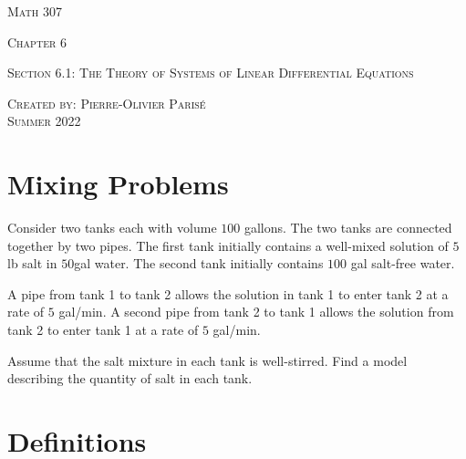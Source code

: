 \documentclass[12pt,a4paper]{article}
\newcounter{example}[section]
\begin{document}
\thispagestyle{empty}

\begin{center}
\vspace*{2.5cm}

{\Huge \textsc{Math 307}}

\vspace*{2cm}

{\LARGE \textsc{Chapter 6}} 

\vspace*{0.75cm}

\noindent\textsc{Section 6.1: The Theory of Systems of Linear Differential Equations}

\vspace*{0.75cm}

\tableofcontents

\vfill

\noindent \textsc{Created by: Pierre-Olivier Paris{\'e}} \\
\textsc{Summer 2022}
\end{center}

\newpage

\section{Mixing Problems}

\begin{example}
Consider two tanks each with volume $100$ gallons. The two tanks are connected together by two pipes. The first tank initially contains a well-mixed solution of $5$lb salt in $50$gal water. The second tank initially contains $100$ gal salt-free water. 

A pipe from tank 1 to tank 2 allows the solution in tank 1 to enter tank 2 at a rate of $5$ gal/min. A second pipe from tank 2 to tank 1 allows the solution from tank 2 to enter tank 1 at a rate of $5$ gal/min.

Assume that the salt mixture in each tank is well-stirred. Find a model describing the quantity of salt in each tank.
\end{example}

\newpage

\section{Definitions}
\end{document}
